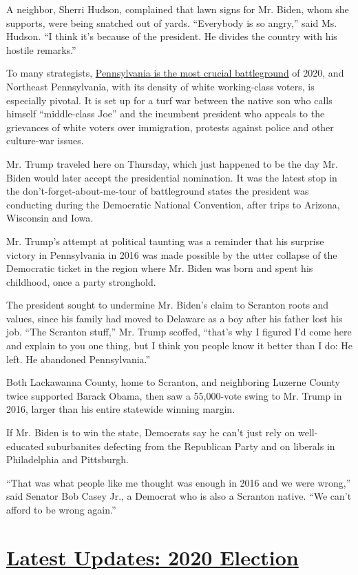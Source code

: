 A neighbor, Sherri Hudson, complained that lawn signs for Mr. Biden,
whom she supports, were being snatched out of yards. ``Everybody is so
angry,'' said Ms. Hudson. ``I think it's because of the president. He
divides the country with his hostile remarks.''

To many strategists,
\href{https://priorities.org/wp-content/uploads/2019/02/2_21_battleground_deck2.pdf}{Pennsylvania
is the most crucial battleground} of 2020, and Northeast Pennsylvania,
with its density of white working-class voters, is especially pivotal.
It is set up for a turf war between the native son who calls himself
``middle-class Joe'' and the incumbent president who appeals to the
grievances of white voters over immigration, protests against police and
other culture-war issues.

Mr. Trump traveled here on Thursday, which just happened to be the day
Mr. Biden would later accept the presidential nomination. It was the
latest stop in the don't-forget-about-me-tour of battleground states the
president was conducting during the Democratic National Convention,
after trips to Arizona, Wisconsin and Iowa.

Mr. Trump's attempt at political taunting was a reminder that his
surprise victory in Pennsylvania in 2016 was made possible by the utter
collapse of the Democratic ticket in the region where Mr. Biden was born
and spent his childhood, once a party stronghold.

The president sought to undermine Mr. Biden's claim to Scranton roots
and values, since his family had moved to Delaware as a boy after his
father lost his job. ``The Scranton stuff,'' Mr. Trump scoffed, ``that's
why I figured I'd come here and explain to you one thing, but I think
you people know it better than I do: He left. He abandoned
Pennsylvania.''

Both Lackawanna County, home to Scranton, and neighboring Luzerne County
twice supported Barack Obama, then saw a 55,000-vote swing to Mr. Trump
in 2016, larger than his entire statewide winning margin.

If Mr. Biden is to win the state, Democrats say he can't just rely on
well-educated suburbanites defecting from the Republican Party and on
liberals in Philadelphia and Pittsburgh.

``That was what people like me thought was enough in 2016 and we were
wrong,'' said Senator Bob Casey Jr., a Democrat who is also a Scranton
native. ``We can't afford to be wrong again.''

\hypertarget{latest-updates-2020-election}{%
\section{\texorpdfstring{\href{https://www.nytimes3xbfgragh.onion/live/2020/08/19/us/dnc-convention-election?action=click\&pgtype=Article\&state=default\&region=MAIN_CONTENT_1\&context=storylines_live_updates}{Latest
Updates: 2020
Election}}{Latest Updates: 2020 Election}}\label{latest-updates-2020-election}}

